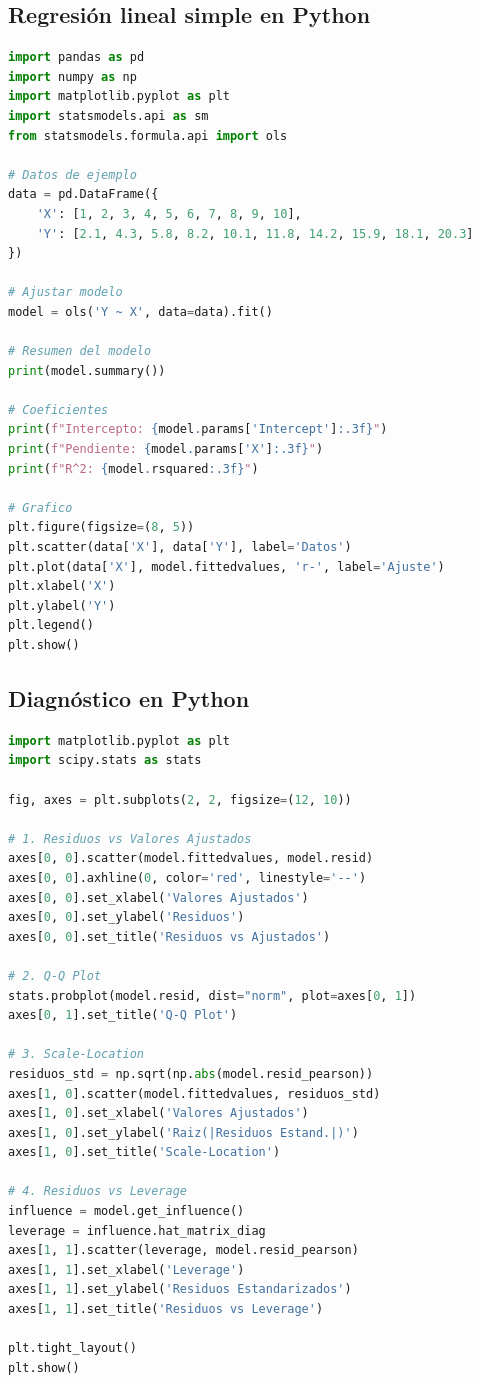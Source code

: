 \documentclass[11pt,a4paper]{article}
\begin{document}
\subsection{Regresión lineal simple en Python}

\begin{lstlisting}[language=Python, caption=Regresión lineal simple con statsmodels]
import pandas as pd
import numpy as np
import matplotlib.pyplot as plt
import statsmodels.api as sm
from statsmodels.formula.api import ols

# Datos de ejemplo
data = pd.DataFrame({
    'X': [1, 2, 3, 4, 5, 6, 7, 8, 9, 10],
    'Y': [2.1, 4.3, 5.8, 8.2, 10.1, 11.8, 14.2, 15.9, 18.1, 20.3]
})

# Ajustar modelo
model = ols('Y ~ X', data=data).fit()

# Resumen del modelo
print(model.summary())

# Coeficientes
print(f"Intercepto: {model.params['Intercept']:.3f}")
print(f"Pendiente: {model.params['X']:.3f}")
print(f"R^2: {model.rsquared:.3f}")

# Grafico
plt.figure(figsize=(8, 5))
plt.scatter(data['X'], data['Y'], label='Datos')
plt.plot(data['X'], model.fittedvalues, 'r-', label='Ajuste')
plt.xlabel('X')
plt.ylabel('Y')
plt.legend()
plt.show()
\end{lstlisting}

\subsection{Diagnóstico en Python}

\begin{lstlisting}[language=Python, caption=Gráficos de diagnóstico]
import matplotlib.pyplot as plt
import scipy.stats as stats

fig, axes = plt.subplots(2, 2, figsize=(12, 10))

# 1. Residuos vs Valores Ajustados
axes[0, 0].scatter(model.fittedvalues, model.resid)
axes[0, 0].axhline(0, color='red', linestyle='--')
axes[0, 0].set_xlabel('Valores Ajustados')
axes[0, 0].set_ylabel('Residuos')
axes[0, 0].set_title('Residuos vs Ajustados')

# 2. Q-Q Plot
stats.probplot(model.resid, dist="norm", plot=axes[0, 1])
axes[0, 1].set_title('Q-Q Plot')

# 3. Scale-Location
residuos_std = np.sqrt(np.abs(model.resid_pearson))
axes[1, 0].scatter(model.fittedvalues, residuos_std)
axes[1, 0].set_xlabel('Valores Ajustados')
axes[1, 0].set_ylabel('Raiz(|Residuos Estand.|)')
axes[1, 0].set_title('Scale-Location')

# 4. Residuos vs Leverage
influence = model.get_influence()
leverage = influence.hat_matrix_diag
axes[1, 1].scatter(leverage, model.resid_pearson)
axes[1, 1].set_xlabel('Leverage')
axes[1, 1].set_ylabel('Residuos Estandarizados')
axes[1, 1].set_title('Residuos vs Leverage')

plt.tight_layout()
plt.show()
\end{lstlisting}
\end{document}
